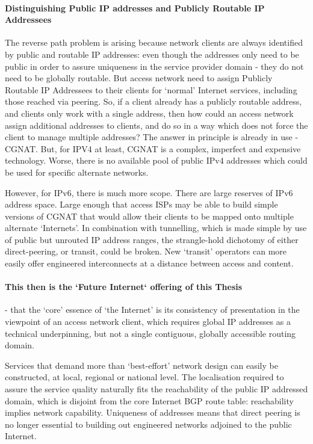 \paragraph{Distinguishing Public IP addresses and Publicly Routable IP Addressees}
The reverse path problem is arising because network clients are always identified by public and routable IP addresses: even though the addresses only need to be public in order to assure uniqueness in the service provider domain - they do not need to be globally routable.  But access network need to assign Publicly Routable IP Addressees to their clients for `normal' Internet services, including those reached via peering.  So, if a client already has a publicly routable address, and clients only work with a single address, then how could an access network assign additional addresses to clients, and do so in a way which does not force the client to manage multiple addresses?  The answer in principle is already in use - CGNAT.  But, for IPV4 at least, CGNAT is a complex, imperfect and expensive technology.  Worse, there is no available pool of public IPv4 addresses which could be used for specific alternate networks.

However, for IPv6, there is much more scope.  There are large reserves of IPv6 address space.  Large enough that access ISPs may be able to build simple versions of CGNAT that would allow their clients to be mapped onto multiple alternate `Internets'.  In combination with tunnelling, which is made simple by use of public but unrouted IP address ranges, the strangle-hold dichotomy of either direct-peering, or transit, could be broken. New `transit' operators can more easily offer engineered interconnects at a distance between access and content.

\paragraph{This then is the `Future Internet` offering of this Thesis} - that the `core' essence of `the Internet' is its consistency of presentation in the viewpoint of an access network client, which requires global IP addresses as a technical underpinning, but not a single contiguous, globally accessible routing domain.

Services that demand more than `best-effort' network design can easily be constructed, at local, regional or national level.  The localisation required to assure the service quality naturally fits the reachability of the public IP addressed domain, which is disjoint from the core Internet BGP route table: reachability implies network capability.  Uniqueness of addresses means that direct peering is no longer essential to building out engineered networks adjoined to the public Internet.

